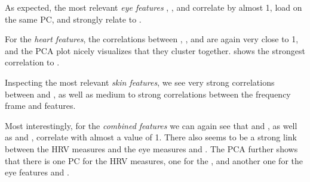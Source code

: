 \documentclass[output=paper]{langsci/langscibook}
\begin{document}
As expected, the most relevant \textit{eye features} %
\fixamount{}, , and\linebreak{} correlate by almost 1, load on the same PC, and strongly relate to \subjCL{}.%

For the \textit{heart features}, %
the correlations between , , and  are again very close to 1, and the PCA plot nicely visualizes that they cluster together. \bvpmedadempatica{} shows the strongest correlation to \subjCL{}. %

Inspecting the most relevant \textit{skin features}, we see very strong correlations between  and \ledalabGlMean{}, as well as medium to strong correlations between the frequency frame and  features. %


Most interestingly, for the \textit{combined features} %
we can again see that  and , as well as \fixamount{} and , correlate with almost a value of 1. There also seems to be a strong link between the HRV measures and the eye measures  and \fixamount{}. %
The PCA further shows that there is one PC for the HRV measures, one for the \ica{}{}, and another one for the eye features \fixamount{} and .
\end{document}
